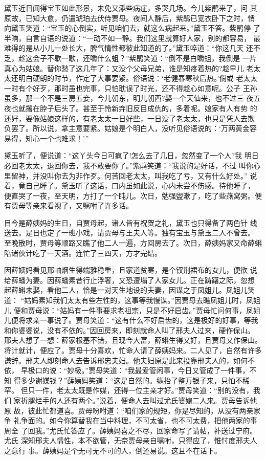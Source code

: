 黛玉近日闻得宝玉如此形景，未免又添些病症，多哭几场。今儿紫鹃来了，问
其原故，已知大愈，仍遣琥珀去伏侍贾母。夜间人静后，紫鹃已宽衣卧下之时，悄
向黛玉笑道：“宝玉的心倒实，听见咱们去，就这么病起来。”黛玉不答。紫鹃停
了半晌，自言自语的说道：“一动不如一静。我们这里就算好人家，别的都容易，
最难得的是从小儿一处长大，脾气情性都彼此知道的了。”黛玉啐道：“你这几天
还不乏，趁这会子不歇一歇，还嚼什么蛆？”紫鹃笑道：“倒不是白嚼蛆，我倒是
一片真心为姑娘。替你愁了这几年了：又没个父母兄弟，谁是知疼着热的?趁早儿
老太太还明白硬朗的时节，作定了大事要紧。俗语说：‘老健春寒秋后热。’倘或
老太太一时有个好歹，那时虽也完事，只怕耽误了时光，还不得趁心如意呢。公子
王孙虽多，那一个不是三房五妾，今儿朝东，明儿朝西?娶一个天仙来，也不过三
夜五夜也就撂在脖子后头了。甚至于怜新弃旧反目成仇的，多着呢。娘家有人有势
的还好，要像姑娘这样的，有老太太一日好些，一日没了老太太，也只是凭人去欺
负罢了。所以说，拿主意要紧。姑娘是个明白人，没听见俗语说的：‘万两黄金容
易得，知心一个也难求！’”

黛玉听了，便说道：“这丫头今日可疯了!怎么去了几日，忽然变了一个人?我
明日必回老太太，退回你去，我不敢要你了。”紫鹃笑道：“我说的是好话，不过
叫你心里留神，并没叫你去为非作歹。何苦回老太太，叫我吃了亏，又有什么好处。”
说着，竟自己睡了。黛玉听了这话，口内虽如此说，心内未尝不伤感。待他睡了，
便直哭了一夜，至天明，方打了一个盹儿。次日，勉强盥漱了，吃了些燕窝粥。便
有贾母等亲来看视了，又嘱咐了许多话。

目今是薛姨妈的生日，自贾母起，诸人皆有祝贺之礼，黛玉也只得备了两色针
线送去。是日也定了一班小戏，请贾母与王夫人等。独有宝玉与黛玉二人不曾去。
至晚散时，贾母等顺路又瞧了他二人一遍，方回房去了。次日，薛姨妈家又命薛蝌
陪诸伙计吃了一天酒。连忙了三四天，方才完结。

因薛姨妈看见邢岫烟生得端雅稳重，且家道贫寒，是个钗荆裙布的女儿，便欲
说给薛蟠为妻。因薛蟠素昔行止浮奢，又恐遭塌了人家女儿。正在踌躇之际，忽想
起薛蝌未娶，看他二人，恰是一对天生地设的夫妻，因谋之于凤姐儿。凤姐儿笑道：
“姑妈素知我们太太有些左性的，这事等我慢谋。”因贾母去瞧凤姐儿时，凤姐儿
便和贾母说：“姑妈有一件事要求老祖宗，只是不好启齿。”贾母忙问何事，凤姐
儿便将求亲一事说了。贾母笑道：“这有什么不好启齿的，这是极好的好事，等我
和你婆婆说，没有不依的。”因回房来，即刻就命人叫了邢夫人过来，硬作保山。
邢夫人想了一想：薛家根基不错，且现今大富，薛蝌生得又好，且贾母又作保山。
将计就计，便应了。贾母十分喜欢，忙命人请了薛姨妈来。二人见了，自然有许多
谦辞。邢夫人即刻命人去告诉邢忠夫妇。他夫妇原是此来投靠邢夫人的，如何不依，
早极口的说：“妙极。”贾母笑道：“我最爱管闲事，今日又管成了一件事，不知
得多少谢媒钱？”薛姨妈笑道：“这是自然的。纵抬了整万银子来，只怕不稀罕。
但只一件，老太太既是作媒，还得一位主亲才好。”贾母笑道：“别的没有，我们
家折腿烂手的人还有两个。”说着，便命人去叫过尤氏婆媳二人来。贾母告诉他原
故，彼此忙都道喜。贾母吩咐道：“咱们家的规矩，你是尽知的，从没有两亲家争
礼争面的。如今你算替我在当中料理，不可太省，也不可太费，把他两家的事周全
了回我。”尤氏忙答应了。薛姨妈喜之不尽，回家命写了请帖，补送过宁府。尤氏
深知邢夫人情性，本不欲管，无奈贾母亲自嘱咐，只得应了，惟忖度邢夫人之意行
事。薛姨妈是个无可无不可的人，倒还易说。这且不在话下。

